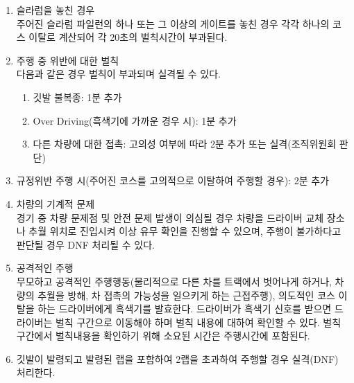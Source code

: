 \documentclass[final,a4paper,10pt]{report}
\begin{document}
{\begin{enumerate}
\begin{enumerate}
      \item\label{rule:formula-competition.endurance.penalties.missed-slalom-gate-penalty} 슬라럼을 놓친 경우\\
        주어진 슬라럼 파일런의 하나 또는 그 이상의 게이트를 놓친 경우 각각 하나의 코스 이탈로 계산되어 각 20초의 벌칙시간이 부과된다.
      \item\label{rule:formula-competition.endurance.penalties.driving-violations} 주행 중 위반에 대한 벌칙\\
        다음과 같은 경우 벌칙이 부과되며 실격될 수 있다.
        \begin{enumerate}
          \item\label{rule:formula-competition.endurance.penalties.driving-violations.flag-noncompliance} 깃발 불복종: 1분 추가
          \item\label{rule:formula-competition.endurance.penalties.driving-violations.overdriving} Over Driving(흑색기에 가까운 경우 시): 1분 추가
          \item\label{rule:formula-competition.endurance.penalties.driving-violations.contact-with-other-car} 다른 차량에 대한 접촉: 고의성 여부에 따라 2분 추가 또는 실격(조직위원회 판단)
        \end{enumerate}
      \item\label{rule:formula-competition.endurance.penalties.intentional-course-deviation} 규정위반 주행 시(주어진 코스를 고의적으로 이탈하여 주행할 경우): 2분 추가
      \item\label{rule:formula-competition.endurance.penalties.mechanical-issue-check} 차량의 기계적 문제\\
        경기 중 차량 문제점 및 안전 문제 발생이 의심될 경우 차량을 드라이버 교체 장소나 추월 위치로 진입시켜 이상 유무 확인을 진행할 수 있으며, 주행이 불가하다고 판단될 경우 DNF 처리될 수 있다.
      \item\label{rule:formula-competition.endurance.penalties.aggressive-driving-black-flag} 공격적인 주행\\
        무모하고 공격적인 주행행동(물리적으로 다른 차를 트랙에서 벗어나게 하거나, 차량의 추월을 방해, 차 접촉의 가능성을 일으키게 하는 근접주행), 의도적인 코스 이탈을 하는 드라이버에게 흑색기를 발효한다. 드라이버가 흑색기 신호를 받으면 드라이버는 벌칙 구간으로 이동해야 하며 벌칙 내용에 대하여 확인할 수 있다. 벌칙 구간에서 벌칙내용을 확인하기 위해 소요된 시간은 주행시간에 포함된다.
      \item\label{rule:formula-competition.endurance.penalties.flag-overstay-2laps-dnf} 깃발이 발령되고 발령된 랩을 포함하여 2랩을 초과하여 주행할 경우 실격(DNF) 처리한다.

\end{enumerate}
\end{enumerate}}
\end{document}
